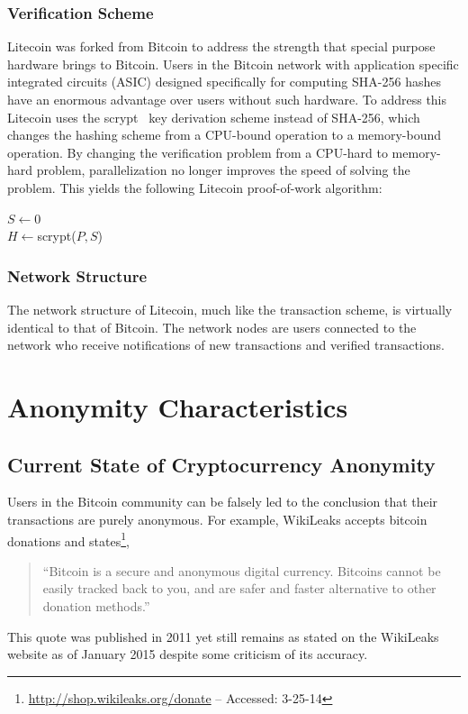 \documentclass[11pt]{article}
\begin{document}
\subsubsection{Verification Scheme}
Litecoin was forked from Bitcoin to address the strength that special purpose hardware brings to Bitcoin. Users in the
Bitcoin network with application specific integrated circuits (ASIC) designed specifically for computing SHA-256 hashes
have an enormous advantage over users without such hardware. To address this Litecoin uses the scrypt~\cite{percival09}
key derivation scheme instead of SHA-256, which changes the hashing scheme from a CPU-bound operation to a memory-bound
operation. By changing the verification problem from a CPU-hard to memory-hard problem, parallelization no longer
improves the speed of solving the problem. This yields the following Litecoin proof-of-work algorithm:
\begin{algorithm}
    $S \gets 0$\\
    $H \gets ${\sc scrypt($P, S$)}\\
\end{algorithm}

\subsubsection{Network Structure}
The network structure of Litecoin, much like the transaction scheme, is virtually identical to that of Bitcoin. The
network nodes are users connected to the network who receive notifications of new transactions and verified
transactions.

\section{Anonymity Characteristics}
\subsection{Current State of Cryptocurrency Anonymity}
Users in the Bitcoin community can be falsely led to the conclusion that their transactions are purely anonymous. For
example, WikiLeaks accepts bitcoin donations and states\footnote{\url{http://shop.wikileaks.org/donate} -- Accessed:
3-25-14},
\begin{quote}
    ``Bitcoin is a secure and anonymous digital currency. Bitcoins cannot be easily tracked back to you, and are safer
    and faster alternative to other donation methods.''
\end{quote}
This quote was published in 2011 yet still remains as stated on the WikiLeaks website as of January 2015 despite some
criticism of its accuracy.
\end{document}
